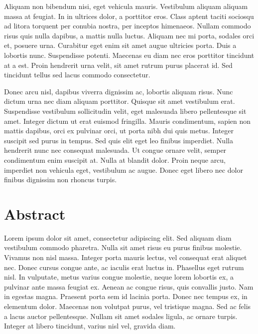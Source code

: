 Aliquam non bibendum nisi, eget vehicula mauris. Vestibulum aliquam aliquam massa at feugiat. In in ultrices dolor, a porttitor eros. Class aptent taciti sociosqu ad litora torquent per conubia nostra, per inceptos himenaeos. Nullam commodo risus quis nulla dapibus, a mattis nulla luctus. Aliquam nec mi porta, sodales orci et, posuere urna. Curabitur eget enim sit amet augue ultricies porta. Duis a lobortis nunc. Suspendisse potenti. Maecenas eu diam nec eros porttitor tincidunt at a est. Proin hendrerit urna velit, sit amet rutrum purus placerat id. Sed tincidunt tellus sed lacus commodo consectetur.

Donec arcu nisl, dapibus viverra dignissim ac, lobortis aliquam risus. Nunc dictum urna nec diam aliquam porttitor. Quisque sit amet vestibulum erat. Suspendisse vestibulum sollicitudin velit, eget malesuada libero pellentesque sit amet. Integer dictum ut erat euismod fringilla. Mauris condimentum, sapien non mattis dapibus, orci ex pulvinar orci, ut porta nibh dui quis metus. Integer suscipit sed purus in tempus. Sed quis elit eget leo finibus imperdiet. Nulla hendrerit nunc nec consequat malesuada. Ut congue ornare velit, semper condimentum enim suscipit at. Nulla at blandit dolor. Proin neque arcu, imperdiet non vehicula eget, vestibulum ac augue. Donec eget libero nec dolor finibus dignissim non rhoncus turpis.


\chapter*{Abstract} %

Lorem ipsum dolor sit amet, consectetur adipiscing elit. Sed aliquam diam vestibulum commodo pharetra. Nulla sit amet risus eu purus finibus molestie. Vivamus non nisl massa. Integer porta mauris lectus, vel consequat erat aliquet nec. Donec cursus congue ante, ac iaculis erat luctus in. Phasellus eget rutrum nisl. In vulputate, metus varius congue molestie, neque lorem lobortis ex, a pulvinar ante massa feugiat ex. Aenean ac congue risus, quis convallis justo. Nam in egestas magna. Praesent porta sem id lacinia porta. Donec nec tempus ex, in elementum dolor. Maecenas non volutpat purus, vel tristique magna. Sed ac felis a lacus auctor pellentesque. Nullam sit amet sodales ligula, ac ornare turpis. Integer at libero tincidunt, varius nisl vel, gravida diam.

